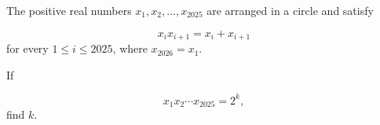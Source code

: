 The positive real numbers $x_1,x_2,\ldots,x_{2025}$ are arranged in a circle and satisfy

\[
        x_ix_{i+1}=x_i+x_{i+1}
    \]for every $1\le i\le 2025$, where $x_{2026}=x_1$.

If

\[
        x_1x_2\cdots x_{2025}=2^k,
    \]find $k$.
